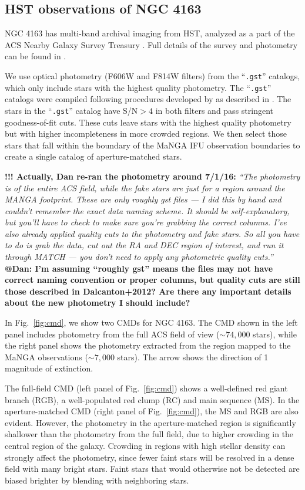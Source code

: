 \documentclass[preprint2]{aastex62}
\begin{document}
\subsection{HST observations of NGC 4163}\label{sec:data:hst}

NGC 4163 has multi-band archival imaging from HST, analyzed as a part of the ACS Nearby Galaxy Survey Treasury \citep[ANGST;][]{Dalcanton+2009, Dalcanton+2012}. Full details of the survey and photometry can be found in \citet{Dalcanton+2009}.

We use optical photometry (F606W and F814W filters) from the ``{\tt .gst}'' catalogs, which only include stars with the highest quality photometry. The ``{\tt .gst}'' catalogs were compiled following procedures developed by \citet{Dolphin+2000} as described in \citet{Dalcanton+2012}. The stars in the ``{\tt .gst}'' catalog have S/N$ > 4$ in both filters and pass stringent goodness-of-fit cuts. These cuts leave stars with the highest quality photometry but with higher incompleteness in more crowded regions. We then select those stars that fall within the boundary of the MaNGA IFU observation boundaries to create a single catalog of aperture-matched stars.

\textbf{!!! Actually, Dan re-ran the photometry around 7/1/16: }\emph{``The photometry is of the entire ACS field, while the fake stars are just for a region around the MANGA footprint. These are only roughly gst files — I did this by hand and couldn't remember the exact data naming scheme.  It should be self-explanatory, but you'll have to check to make sure you're grabbing the correct columns. I've also already applied quality cuts to the photometry and fake stars.  So all you have to do is grab the data, cut out the RA and DEC region of interest, and run it through MATCH — you don't need to apply any photometric quality cuts.''} \textbf{@Dan: I'm assuming ``roughly gst'' means the files may not have correct naming convention or proper columns, but quality cuts are still those described in Dalcanton+2012? Are there any important details about the new photometry I should include?}

In Fig.~\ref{fig:cmd}, we show two CMDs for NGC 4163. The CMD shown in the left panel includes photometry from the full ACS field of view (${\sim}74,000$ stars), while the right panel shows the photometry extracted from the region mapped to the MaNGA observations (${\sim}7,000$ stars). The arrow shows the direction of 1 magnitude of extinction.

The full-field CMD (left panel of Fig.~\ref{fig:cmd}) shows a well-defined red giant branch (RGB), a well-populated red clump (RC) and main sequence (MS). In the aperture-matched CMD (right panel of Fig.~\ref{fig:cmd}), the MS and RGB are also evident. However, the photometry in the aperture-matched region is significantly shallower than the photometry from the full field, due to higher crowding in the central region of the galaxy. Crowding in regions with high stellar density can strongly affect the photometry, since fewer faint stars will be resolved in a dense field with many bright stars. Faint stars that would otherwise not be detected are biased brighter by blending with neighboring stars.
\end{document}
